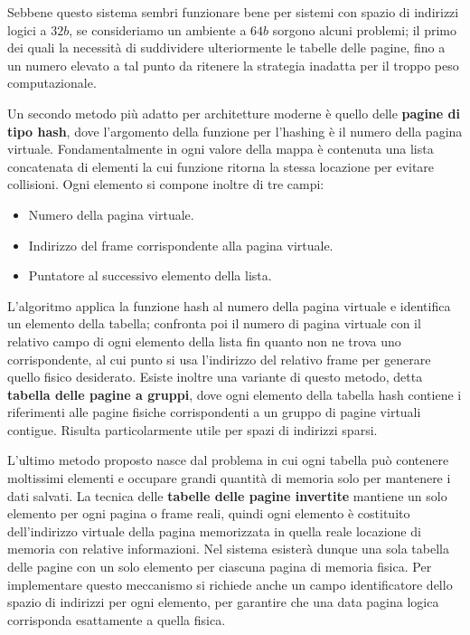 \noindent Sebbene questo sistema sembri funzionare bene per sistemi con spazio di indirizzi logici a $32b$, se consideriamo un ambiente a $64b$ sorgono
alcuni problemi; il primo dei quali la necessità di suddividere ulteriormente le tabelle delle pagine, fino a un numero elevato a tal punto da ritenere
la strategia inadatta per il troppo peso computazionale.\par
Un secondo metodo più adatto per architetture moderne è quello delle \textbf{pagine di tipo hash}, dove l'argomento della funzione per l'hashing è il
numero della pagina virtuale. Fondamentalmente in ogni valore della mappa è contenuta una lista concatenata di elementi la cui funzione ritorna la
stessa locazione per evitare collisioni. Ogni elemento si compone inoltre di tre campi: \begin{itemize}
    \item Numero della pagina virtuale.
    \item Indirizzo del frame corrispondente alla pagina virtuale.
    \item Puntatore al successivo elemento della lista.
\end{itemize}

\noindent L'algoritmo applica la funzione hash al numero della pagina virtuale e identifica un elemento della tabella; confronta poi il numero di
pagina virtuale con il relativo campo di ogni elemento della lista fin quanto non ne trova uno corrispondente, al cui punto si usa l'indirizzo del
relativo frame per generare quello fisico desiderato. Esiste inoltre una variante di questo metodo, detta \textbf{tabella delle pagine a gruppi}, dove
ogni elemento della tabella hash contiene i riferimenti alle pagine fisiche corrispondenti a un gruppo di pagine virtuali contigue. Risulta
particolarmente utile per spazi di indirizzi sparsi.\par
L'ultimo metodo proposto nasce dal problema in cui ogni tabella può contenere moltissimi elementi e occupare grandi quantità di memoria solo per
mantenere i dati salvati. La tecnica delle \textbf{tabelle delle pagine invertite} mantiene un solo elemento per ogni pagina o frame reali, quindi
ogni elemento è costituito dell'indirizzo virtuale della pagina memorizzata in quella reale locazione di memoria con relative informazioni. Nel sistema
esisterà dunque una sola tabella delle pagine con un solo elemento per ciascuna pagina di memoria fisica. Per implementare questo meccanismo si richiede
anche un campo identificatore dello spazio di indirizzi per ogni elemento, per garantire che una data pagina logica corrisponda esattamente a quella
fisica.

